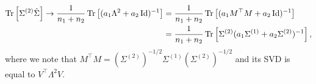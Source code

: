 \begin{align*}
  \operatorname{Tr}\left[\Sigma^{(2)} \hat{\Sigma}\right] \rightarrow \frac{1}{n_1+n_2}\operatorname{Tr}\left[(a_1 \Lambda^2 + a_2\operatorname{Id})^{-1}\right] &= \frac1{n_1+n_2}\operatorname{Tr}\left[(a_1 M^{\top}M + a_2 \operatorname{Id})^{-1}\right] \\
  &=\frac{1}{n_1+n_2} \operatorname{Tr}\left[\Sigma^{(2)} (a_1 \Sigma^{(1)} + a_2 \Sigma^{(2)})^{-1}\right], 
  \end{align*}
where we note that $M^\top M = (\Sigma^{(2)})^{-1/2} \Sigma^{(1)} (\Sigma^{(2)})^{-1/2}$ and its SVD is equal to $V^{\top}\Lambda^2 V$.

